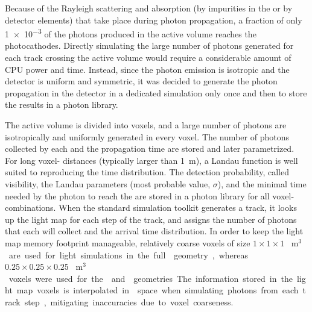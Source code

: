Because of the Rayleigh scattering and absorption (by impurities in the \lar or by detector elements) that take place during photon propagation, a fraction of only \num{1e-3}  of the photons produced in the \lar active volume reaches the  photocathodes. Directly simulating the large number of photons generated for each track crossing the active volume would require a considerable amount of CPU power and time. %
Instead, since the photon emission is isotropic and the detector is uniform and symmetric, it was decided to generate the photon propagation in the detector in a dedicated  simulation only once and then to store the results in a photon library.

The active volume is divided into voxels, and a large number of photons are isotropically and uniformly generated in every voxel. The number of photons collected by each  and the propagation time are stored and later parametrized. For long voxel- distances (typically larger than \SI{1}{\m}), a Landau function is well suited to reproducing the time distribution. The detection probability, called visibility, the Landau parameters (most probable value, $\sigma$), and the minimal time needed by the photon to reach the  are stored in a photon library for all voxel- combinations. %
When the standard \dual {} simulation toolkit generates a track, it looks up the light map for each step of the track, and assigns the number of photons that each  will collect and the arrival time distribution. %
In order to keep the light map memory footprint manageable, relatively coarse voxels of size $1\times 1\times 1$ \SI{}{m$^3$} are used for light simulations in the full  geometry, whereas $0.25\times 0.25\times 0.25$ \SI{}{m$^3$} voxels were used for the  and  geometries. The information stored in the light map voxels is interpolated in \threed space when simulating photons from each track step,  mitigating inaccuracies due to voxel coarseness.

